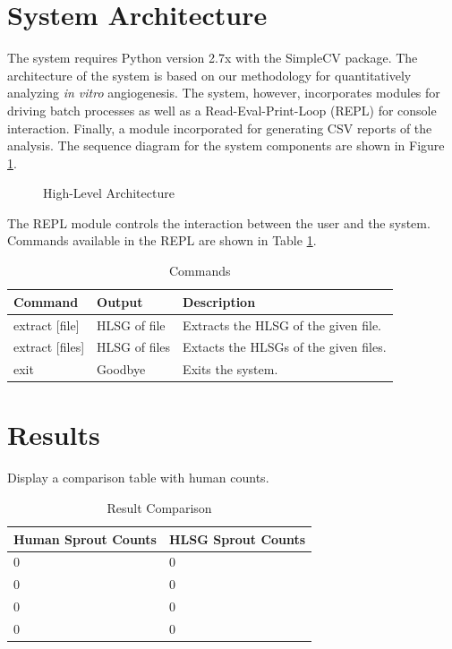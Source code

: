\documentclass{sig-alternate}
\newcommand{\invitro}{\emph{in vitro} }
\begin{document}
\section{System Architecture} %
\label{sec:System Architecture}
	The system requires Python version 2.7x with the SimpleCV package. The
	architecture of the system is based on our methodology for
	quantitatively analyzing \invitro angiogenesis. The system, however,
	incorporates modules for driving batch processes as well as a
	Read-Eval-Print-Loop (REPL) for console interaction. Finally, a module
	incorporated for generating CSV reports of the analysis. The sequence
	diagram for the system components are shown in Figure
	\ref{fig:sysarch}.
	\begin{figure}[ht!]
		\centering
		
		\caption{High-Level Architecture}
		\label{fig:sysarch}
	\end{figure}

	The REPL module controls the interaction between the user and the
	system. Commands available in the REPL are shown in Table
	\ref{tab:commands}.
	\begin{table}[h!]
		\begin{tabular}{| l | l | p{4cm} |}
			\hline
			\textbf{Command} & \textbf{Output} & \textbf{Description} \\\hline
			extract [file] & HLSG of file & Extracts the HLSG of the given file. \\\hline
			extract [files] & HLSG of files & Extacts the HLSGs of the given files. \\\hline
			exit & Goodbye & Exits the system. \\\hline
		\end{tabular}
		\caption{Commands}
		\label{tab:commands}
	\end{table}

\section{Results} %
\label{sec:Results}
	Display a comparison table with human counts.
	\begin{table}[h!]
		\centering
		\begin{tabular}{| l | l |}
			\hline
			\textbf{Human Sprout Counts} & \textbf{HLSG Sprout Counts} \\\hline
			0 & 0 \\\hline
			0 & 0 \\\hline
			0 & 0 \\\hline
			0 & 0 \\\hline
		\end{tabular}
		\caption{Result Comparison}
		\label{tab:resultcomp}
	\end{table}
\end{document}
